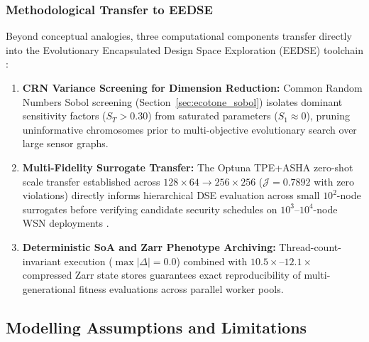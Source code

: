 \subsubsection{Methodological Transfer to EEDSE}
Beyond conceptual analogies, three computational components transfer directly into the Evolutionary Encapsulated Design Space Exploration (EEDSE) toolchain \cite{forster2024topology, dietrich2025visual}:
\begin{enumerate}
  \item \textbf{CRN Variance Screening for Dimension Reduction:} Common Random Numbers Sobol screening (Section~\ref{sec:ecotone_sobol}) isolates dominant sensitivity factors ($S_T > 0.30$) from saturated parameters ($S_1 \approx 0$), pruning uninformative chromosomes prior to multi-objective evolutionary search over large sensor graphs.
  \item \textbf{Multi-Fidelity Surrogate Transfer:} The Optuna TPE+ASHA zero-shot scale transfer established across $128 \times 64 \to 256 \times 256$ ($\mathcal{J} = 0.7892$ with zero violations) directly informs hierarchical DSE evaluation across small $10^2$-node surrogates before verifying candidate security schedules on $10^3\text{--}10^4$-node WSN deployments \cite{forster2024topology}.
  \item \textbf{Deterministic SoA and Zarr Phenotype Archiving:} Thread-count-invariant execution ($\max|\Delta| = 0.0$) combined with $10.5\times\text{--}12.1\times$ compressed Zarr state stores guarantees exact reproducibility of multi-generational fitness evaluations across parallel worker pools.
\end{enumerate}

\subsection{Modelling Assumptions and Limitations}
\label{subsec:model_limitations}

